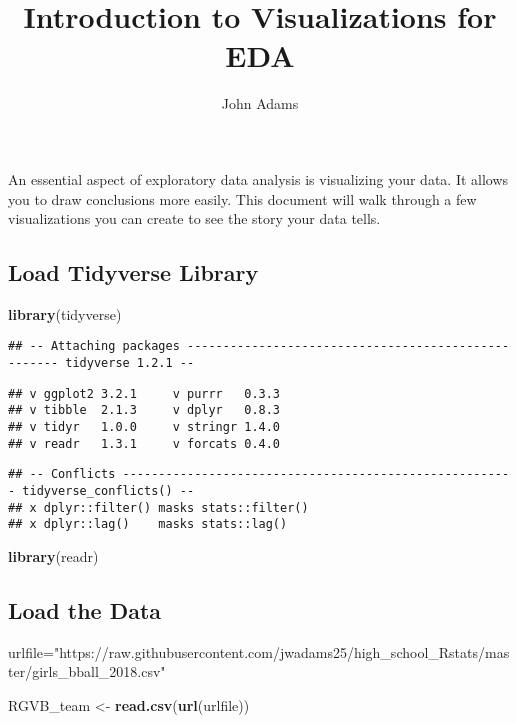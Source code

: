 \documentclass[]{article}
\title{Introduction to Visualizations for EDA}
\author{John Adams}
\date{}
\newenvironment{Shaded}{\begin{snugshade}}{\end{snugshade}}
\newcommand{\KeywordTok}[1]{\textcolor[rgb]{0.13,0.29,0.53}{\textbf{#1}}}
\newcommand{\NormalTok}[1]{#1}
\newcommand{\StringTok}[1]{\textcolor[rgb]{0.31,0.60,0.02}{#1}}
\begin{document}
\maketitle

An essential aspect of exploratory data analysis is visualizing your
data. It allows you to draw conclusions more easily. This document will
walk through a few visualizations you can create to see the story your
data tells.

\hypertarget{load-tidyverse-library}{%
\subsection{Load Tidyverse Library}\label{load-tidyverse-library}}

\begin{Shaded}
\begin{Highlighting}[]
\KeywordTok{library}\NormalTok{(tidyverse)}
\end{Highlighting}
\end{Shaded}

\begin{verbatim}
## -- Attaching packages ---------------------------------------------------- tidyverse 1.2.1 --
\end{verbatim}

\begin{verbatim}
## v ggplot2 3.2.1     v purrr   0.3.3
## v tibble  2.1.3     v dplyr   0.8.3
## v tidyr   1.0.0     v stringr 1.4.0
## v readr   1.3.1     v forcats 0.4.0
\end{verbatim}

\begin{verbatim}
## -- Conflicts ------------------------------------------------------- tidyverse_conflicts() --
## x dplyr::filter() masks stats::filter()
## x dplyr::lag()    masks stats::lag()
\end{verbatim}

\begin{Shaded}
\begin{Highlighting}[]
\KeywordTok{library}\NormalTok{(readr)}
\end{Highlighting}
\end{Shaded}

\hypertarget{load-the-data}{%
\subsection{Load the Data}\label{load-the-data}}

\begin{Shaded}
\begin{Highlighting}[]
\NormalTok{urlfile=}\StringTok{"https://raw.githubusercontent.com/jwadams25/high_school_Rstats/master/girls_bball_2018.csv"}

\NormalTok{RGVB_team <-}\StringTok{ }\KeywordTok{read.csv}\NormalTok{(}\KeywordTok{url}\NormalTok{(urlfile))}
\end{Highlighting}
\end{Shaded}
\end{document}
